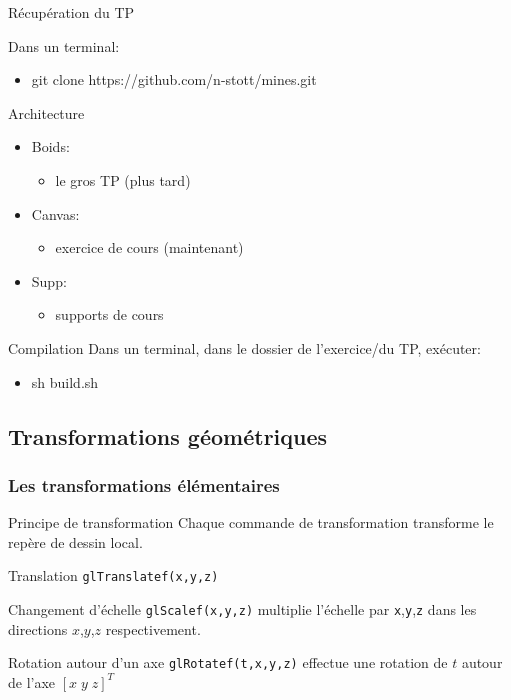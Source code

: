 \documentclass{beamer}
\begin{document}
\begin{frame}{Récupération du TP}

\begin{block}{Dans un terminal:}
\begin{itemize}
\item git clone https://github.com/n-stott/mines.git
\end{itemize}
\end{block}

\begin{block}{Architecture}
\begin{itemize}
\item Boids:
\begin{itemize}
\item  le gros TP (plus tard)
\end{itemize}
\item Canvas:
\begin{itemize}
\item exercice de cours (maintenant)
\end{itemize}
\item Supp:
\begin{itemize}
\item supports de cours
\end{itemize}
\end{itemize}
\end{block}

\begin{block}{Compilation}
Dans un terminal, dans le dossier de l'exercice/du TP, exécuter:
\begin{itemize}
\item sh build.sh
\end{itemize}
\end{block}

\end{frame}





\subsection{Transformations géométriques}

\begin{frame}
\frametitle{Les transformations élémentaires}
	\begin{alertblock}{Principe de transformation}
		Chaque commande de transformation transforme le repère de dessin local.
	\end{alertblock}
	\begin{block}{Translation}
		\verb!glTranslatef(x,y,z)! 
	\end{block}
	\begin{block}{Changement d'échelle}
		\verb!glScalef(x,y,z)! multiplie l'échelle par \verb!x!,\verb!y!,\verb!z! dans les directions $x$,$y$,$z$ respectivement.
	\end{block}
	\begin{block}{Rotation autour d'un axe}
		\verb!glRotatef(t,x,y,z)! effectue une rotation de $t$ autour de l'axe $[x\;y\;z]^T$
	\end{block}
\end{frame}
\end{document}
